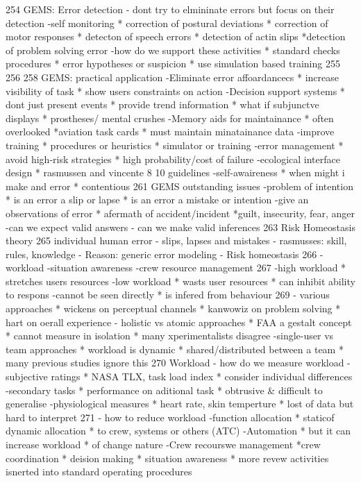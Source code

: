 254 GEMS: Error detection
- dont try to elmininate errors but focus on their detection
-self monitoring
* correction of postural deviations
* correction of motor responses
* detecton of speech errors
* detection of actin slips
*detection of problem solving error
-how do we support these activities
* standard checks procedures
* error hypotheses or suspicion
* use simulation based training
255
256 
258 GEMS: practical application
-Eliminate error affoardancecs
* increase visibility of task
* show users constraints on action
-Decision support systems
* dont just present events
* provide trend information
* what if subjunctve displays
* prostheses/ mental crushes
-Memory aids for maintainance
* often overlooked
*aviation task cards
* must maintain minatainance data
-improve training
* procedures or heuristics
* simulator or training
-error management
* avoid high-risk strategies
* high probability/cost of failure
-ecological interface design
* rasmussen and vincente
8 10 guidelines
-self-awaireness
* when might i make and error
* contentious
261 GEMS outstanding issues
-problem of intention
* is an error a slip or lapse
* is an error a mistake or intention
-give an observations of error
* afermath of accident/incident
*guilt, insecurity, fear, anger
-can we expect valid answers
- can we make valid inferences
263 Risk Homeostasis theory
265 individual human error
- slips, lapses and mistakes
- rasmusses: skill, rules, knowledge
- Reason: generic error modeling
- Risk homeostasis
266
- workload
-situation awareness
-crew resource management
267
-high workload
* stretches users resources
-low workload
* wasts user resources
* can inhibit ability to respons
-cannot be seen directly
* is infered from behaviour
269
- various approaches
* wickens on perceptual channels
* kanwowiz on problem solving
* hart on oerall experience
- holistic vs atomic approaches
* FAA a gestalt concept
* cannot measure in isolation
* many xperimentalists disagree
-single-user vs team approaches
* workload is dynamic
* shared/distributed between a team
* many previous studies ignore this
270 Workload
- how do we measure workload
-subjective ratings
* NASA TLX, task load index
* consider individual differences
-secondary tasks
* performance on aditional task
* obtrusive & difficult to generalise
-physiological measures
* heart rate, skin temperture
* lost of data but hard to interpret
271
- how to reduce workload
-function allocation
* staticof dynamic allocation
* to crew, systems or others (ATC)
-Automation
* but it can increase workload
* of change nature
-Crew recourswe management
*crew coordination
* deision making
* situation awareness
* more revew activities isnerted into standard operating procedures
\cite{winceckCriticalToSafety}
\cite{chambersHazardAnalysisSCS}
\cite{rslater1998SCSAnalysis}
\cite{knightchallengessafetyCritical}
\cite{johnson2006devsafetycritical}
\cite{daucriticalsafetyconsider}
\cite{fallsafedesign}
\cite{arForce2015VerificationExpectations}
\cite{nebulaassessment}
\cite{lalaArchitecturalPrinciples}
\cite{mitNotesSafetyCritical}
\cite{britishColumbia2020GuideSafetyCritical}
\cite{fulvio1993safetycriticalsystems}
\cite{dlrtabid}
\cite{knight2010SafetyCritical}
\cite{creavisafecritical}
\cite{valdes2018SafetybyAutomation}
\cite{2015whensafetymanagementsystemsfail}
